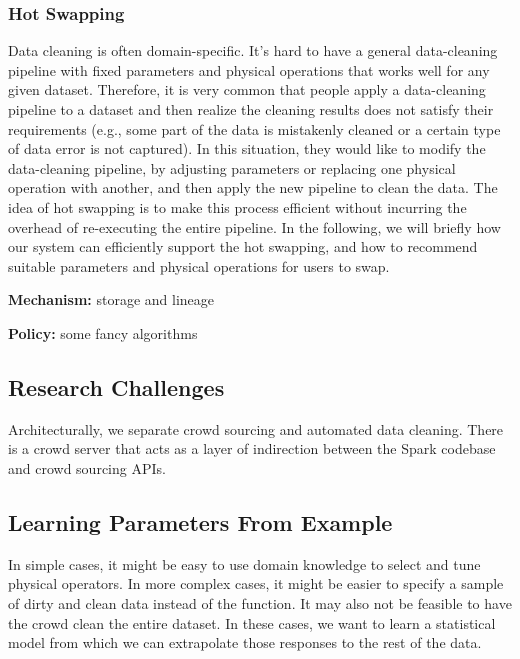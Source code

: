 \subsubsection{Hot Swapping}
Data cleaning is often domain-specific. It's hard to have a general data-cleaning pipeline with fixed parameters and physical operations that works well for any given dataset. Therefore, it is very common that people apply a data-cleaning pipeline to a dataset and then realize the cleaning results does not satisfy their requirements (e.g.,  some part of the data is mistakenly cleaned or a certain type of data error is not captured). In this situation, they would like to modify the data-cleaning pipeline, by adjusting parameters or replacing one physical operation with another, and then apply the new pipeline to clean the data. The idea of hot swapping is to make this process efficient without incurring the overhead of re-executing the entire pipeline. In the following, we will briefly how our system can efficiently support the hot swapping, and how to recommend suitable parameters and physical operations for users to swap. 


\vspace{.5em}

{\noindent \bf Mechanism:} storage and lineage

\vspace{.5em}

{\noindent \bf Policy:} some fancy algorithms





\iffalse
\subsection{Research Challenges}

Architecturally, we separate crowd sourcing and automated data cleaning.
There is a crowd server that acts as a layer of indirection between the Spark codebase and crowd sourcing APIs.




\subsection{Learning Parameters From Example}
In simple cases, it might be easy to use domain knowledge to select and tune physical operators. 
In more complex cases, it might be easier to specify a sample of dirty and clean data instead of the function.
It may also not be feasible to have the crowd clean the entire dataset.
In these cases, we want to learn a statistical model from which we can extrapolate those responses to the rest 
of the data.

